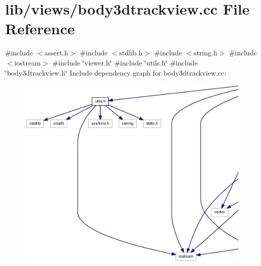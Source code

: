 \section{lib/views/body3dtrackview.cc \-File \-Reference}
\label{body3dtrackview_8cc}
{\ttfamily \#include $<$assert.\-h$>$}\*
{\ttfamily \#include $<$stdlib.\-h$>$}\*
{\ttfamily \#include $<$string.\-h$>$}\*
{\ttfamily \#include $<$iostream$>$}\*
{\ttfamily \#include \char`\"{}viewer.\-h\char`\"{}}\*
{\ttfamily \#include \char`\"{}utils.\-h\char`\"{}}\*
{\ttfamily \#include \char`\"{}body3dtrackview.\-h\char`\"{}}\*
\-Include dependency graph for body3dtrackview.\-cc\-:
\nopagebreak
\begin{figure}[H]
\begin{center}
\leavevmode
\includegraphics[width=350pt]{body3dtrackview_8cc__incl}
\end{center}
\end{figure}
